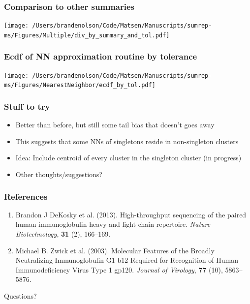 \documentclass[mathserif,compress]{beamer}
\renewcommand\;{\,}
\begin{document}
\begin{frame}\frametitle{Comparison to other summaries}
\begin{center}
\texttt{[image: /Users/brandenolson/Code/Matsen/Manuscripts/sumrep-ms/Figures/Multiple/div\_by\_summary\_and\_tol.pdf]}
\end{center}
\end{frame}

\begin{frame}\frametitle{Ecdf of NN approximation routine by tolerance}
\begin{center}
\texttt{[image: /Users/brandenolson/Code/Matsen/Manuscripts/sumrep-ms/Figures/NearestNeighbor/ecdf\_by\_tol.pdf]}
\end{center}
\end{frame}

\begin{frame}\frametitle{Stuff to try}
\begin{itemize}
\item
Better than before, but still some tail bias that doesn't goes away
\bigskip
\item
This suggests that some NNs of singletons reside in non-singleton clusters
\bigskip
\item
Idea: Include centroid of every cluster in the singleton cluster (in progress)
\bigskip
\item
Other thoughts/suggestions?

\end{itemize}
\end{frame}

\begin{frame}\frametitle{References}
\begin{enumerate}
\item
Brandon J DeKosky et al. (2013).
High-throughput sequencing of the paired human
immunoglobulin heavy and light chain repertoire.
\emph{Nature Biotechnology}, \textbf{31} (2), 166--169.
\bigskip
\item
Michael B. Zwick et al. (2003).
Molecular Features of the Broadly Neutralizing Immunoglobulin G1 b12 Required for Recognition of Human Immunodeficiency Virus Type 1 gp120.
\emph{Journal of Virology}, \textbf{77} (10), 5863--5876.
\end{enumerate}
\end{frame}


\begin{frame}
\begin{center}
\Huge
Questions?
\end{center}
\end{frame}
\end{document}
